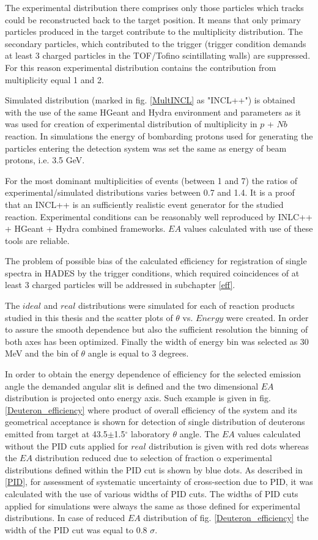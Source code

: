 The experimental distribution there comprises only those particles 
which tracks could be reconstructed back to the target position.  
It means that only primary particles produced in the target contribute to the multiplicity distribution. The secondary particles, which contributed to the trigger (trigger condition demands at least 3 charged particles in the TOF/Tofino 
scintillating walls) are suppressed. For this reason experimental distribution contains the contribution from multiplicity equal 1 and 2. 

Simulated distribution (marked in fig. \ref{MultINCL} as "INCL++")
is obtained with the use of the same HGeant and Hydra environment and parameters as it was used for creation of experimental distribution of multiplicity in $p$ + $Nb$ reaction. In simulations the energy of bombarding protons used for generating the particles entering the detection system was set the same as energy of beam protons, i.e. 3.5 GeV.  

For the most dominant multiplicities of events (between 1 and 7) 
the ratios of experimental/simulated distributions varies between 0.7 and 1.4. It is a proof that an INCL++ is an sufficiently realistic event generator for the studied reaction. Experimental conditions can be reasonably well reproduced by INLC++ + HGeant + Hydra combined frameworks. $EA$ values calculated with use of these 
tools are reliable.  

The problem of possible bias of the calculated efficiency for registration of single spectra in HADES by the trigger conditions, which required coincidences 
of at least 3 charged particles will be addressed in subchapter \ref{eff}.   

The $ideal$ and $real$ distributions were simulated for each of reaction products studied in this thesis and the scatter plots of $\theta$ vs. $Energy$ were created. In order to assure the smooth dependence but also the sufficient resolution the binning of both axes 
has been optimized. Finally the width of energy bin was selected as 
30 MeV and the bin of $\theta$ angle 
is equal to 3 degrees.



In order to obtain the energy dependence of efficiency 
for the selected emission angle the demanded angular 
slit is defined and the two dimensional  $EA$ distribution 
is projected onto energy axis. Such example is given in fig. \ref{Deuteron_efficiency} where 
product of overall efficiency of the system and its geometrical acceptance is shown for detection of single distribution of deuterons emitted from target at 43.5$\pm$1.5$^{\circ}$ laboratory $\theta$ angle. The $EA$ values calculated without the PID cuts applied for $real$ distribution is given with red dots whereas the 
$EA$ distribution reduced due to selection of fraction o experimental distributions defined within the PID cut is shown by blue dots. As described in \ref{PID}, for assessment of systematic uncertainty of cross-section due to PID, it was calculated with the use of various widths of PID cuts. The widths of PID cuts applied for simulations 
were always the same as those defined for experimental distributions. In case of reduced $EA$ distribution 
of fig. \ref{Deuteron_efficiency} the width of the PID cut was equal to 0.8 $\sigma$.

